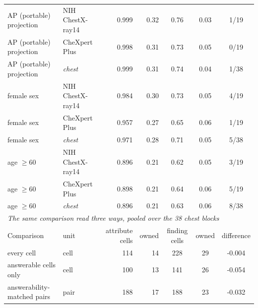 \begin{table}[htbp]
{\begin{tabular}{llrrccc}
\midrule
AP (portable) projection & NIH ChestX-ray14 & 0.999 & 0.32 & 0.76 & 0.03 & 1/19 \\
AP (portable) projection & CheXpert Plus & 0.998 & 0.31 & 0.73 & 0.05 & 0/19 \\
AP (portable) projection & \textit{chest} & 0.999 & 0.31 & 0.74 & 0.04 & 1/38 \\
female sex & NIH ChestX-ray14 & 0.984 & 0.30 & 0.73 & 0.05 & 4/19 \\
female sex & CheXpert Plus & 0.957 & 0.27 & 0.65 & 0.06 & 1/19 \\
female sex & \textit{chest} & 0.971 & 0.28 & 0.71 & 0.05 & 5/38 \\
age $\geq60$ & NIH ChestX-ray14 & 0.896 & 0.21 & 0.62 & 0.05 & 3/19 \\
age $\geq60$ & CheXpert Plus & 0.898 & 0.21 & 0.64 & 0.06 & 5/19 \\
age $\geq60$ & \textit{chest} & 0.896 & 0.21 & 0.63 & 0.06 & 8/38 \\
\midrule
\multicolumn{7}{l}{\textit{The same comparison read three ways, pooled over the 38 chest blocks}} \\
Comparison & unit & attribute cells & owned & finding cells & owned & difference \\
\midrule
every cell & cell & 114 & 14 & 228 & 29 & -0.004 \\
answerable cells only & cell & 100 & 13 & 141 & 26 & -0.054 \\
answerability-matched pairs & pair & 188 & 17 & 188 & 23 & -0.032 \\
\bottomrule
\end{tabular}}
\end{table}

